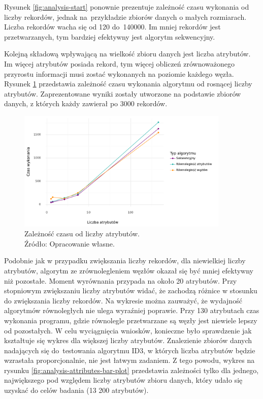 \documentclass[12pt]{article}
\begin{document}
Rysunek \ref{fig:analysis-start} ponownie prezentuje zależność czasu wykonania od
liczby rekordów, jednak na~przykładzie zbiorów danych o małych rozmiarach. Liczba rekordów wacha się od 120 do~140000. 
Im mniej rekordów jest przetwarzanych, tym bardziej efektywny jest algorytm sekwencyjny.

Kolejną składową wpływającą na wielkość zbioru danych jest liczba atrybutów. Im więcej atrybutów posiada
rekord, tym więcej obliczeń zrównoważonego przyrostu informacji musi zostać wykonanych na poziomie każdego węzła.
Rysunek \ref{fig:analysis-attributes} przedstawia zależność czasu wykonania algorytmu od rosnącej liczby atrybutów.
Zaprezentowane wyniki zostały utworzone na podstawie zbiorów danych, z których każdy zawierał po 3000 rekordów.

\begin{figure}[H]
    \centering
	\includegraphics[width=0.9\textwidth]{analysis-attributes.pdf}
    \caption{Zależność czasu od liczby atrybutów.\\Źródło: Opracowanie własne.}
    \label{fig:analysis-attributes}
\end{figure}

Podobnie jak w przypadku zwiększania liczby rekordów, dla niewielkiej liczby atrybutów, algorytm ze
zrównolegleniem węzłów okazał się być mniej efektywny niż pozostałe. Moment wyrównania
przypada na około 20 atrybutów. Przy stopniowym zwiększaniu liczby atrybutów widać, że
zachodzą różnice w stosunku do zwiększania liczby rekordów.
Na wykresie można zauważyć, że wydajność algorytmów równoległych
nie ulega wyraźniej poprawie. Przy 130 atrybutach czas wykonania programu, gdzie równolegle przetwarzane są węzły
jest niewiele lepszy od pozostałych. W celu wyciągnięcia wniosków, konieczne było sprawdzenie jak kształtuje się
wykres dla większej liczby atrybutów. Znalezienie zbiorów danych nadających się do~testowania algorytmu ID3, w których liczba
atrybutów będzie wzrastała proporcjonalnie, nie jest łatwym zadaniem. Z tego powodu, wykres na rysunku \ref{fig:analysis-attributes-bar-plot} przedstawia zależności tylko dla
jednego, największego pod względem liczby atrybutów zbioru danych, który udało się uzyskać do celów badania (13 200 atrybutów).
\end{document}
